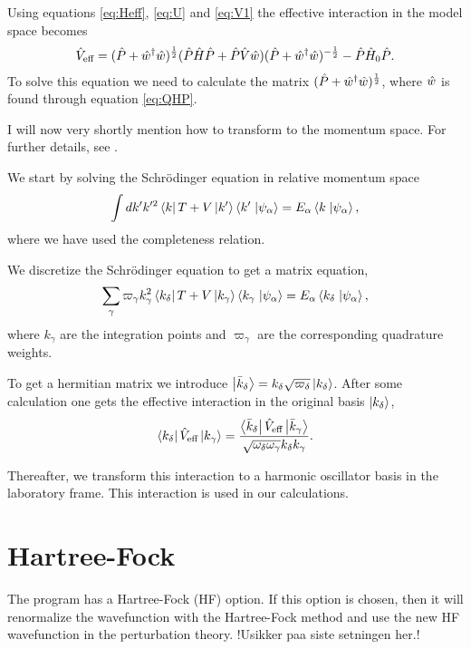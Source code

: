 Using equations \ref{eq:Heff}, \ref{eq:U} and \ref{eq:V1} the effective
interaction in the model space becomes
\begin{align}
	\hat{V}_{\textrm{eff}} = (\hat{P}+\hat{w}^\dagger\hat{w})^{\frac12}(\hat{P}\hat{H}\hat{P}+\hat{P}\hat{V}\hat{w})(\hat{P}+\hat{w}^\dagger\hat{w})^{-\frac12}-\hat{P}\hat{H}_0\hat{P}.
\end{align}
To solve this equation we need to calculate the matrix
$(\hat{P}+\hat{w}^\dagger\hat{w})^{\frac12}$, where $\hat{w}$ is found through equation
\ref{eq:QHP}.

I will now very shortly mention how to transform to the momentum space. For
further details, see \citep{G-matrix}.

We start by solving the Schr\"{o}dinger equation in relative momentum space
\begin{align}
	\int dk'k'^2\left\langle k \right|T+V\left| k' \right\rangle\left\langle k' \right.\left| \psi_\alpha \right\rangle = E_\alpha\left\langle k \right.\left| \psi_\alpha \right\rangle,
\end{align}
where we have used the completeness relation.

We discretize the Schr\"{o}dinger equation to get a matrix equation,
\begin{align}
	\sum_\gamma\varpi_\gamma k_\gamma^2\left\langle k_\delta \right|T+V\left| k_\gamma \right\rangle\left\langle k_\gamma \right.\left| \psi_\alpha \right\rangle = E_\alpha\left\langle k_\delta \right.\left| \psi_\alpha \right\rangle,
\end{align}
where $k_\gamma$ are the integration points and $\varpi_\gamma$ are the
corresponding quadrature weights.

To get a hermitian matrix we introduce $\left| \bar k_\delta \right\rangle =
k_\delta\sqrt{\varpi_\delta}\left| k_\delta \right\rangle$. After some calculation one gets
the effective interaction in the original basis $\left| k_\delta \right\rangle$,
\begin{align}
	\left\langle k_\delta \right|\hat{V}_{\textrm{eff}}\left| k_\gamma \right\rangle = \frac{\left\langle \bar k_\delta \right|\hat{V}_{\textrm{eff}}\left| \bar k_\gamma \right\rangle}{\sqrt{\omega_\delta\omega_\gamma}k_\delta k_\gamma}.
\end{align}

Thereafter, we transform this interaction to a harmonic oscillator basis in the
laboratory frame. This interaction is used in our calculations.


\section{Hartree-Fock}

The program has a Hartree-Fock (HF) option. If this option is chosen, then it
will renormalize the wavefunction with the Hartree-Fock method and use the new
HF wavefunction in the perturbation theory. !Usikker paa siste setningen her.!

